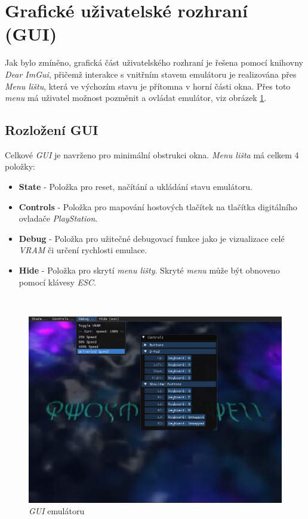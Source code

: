\section{Grafické uživatelské rozhraní (GUI)}

Jak bylo zmíněno, grafická část uživatelského rozhraní je řešena pomocí knihovny \textit{Dear ImGui}, přičemž interakce s vnitřním stavem emulátoru
je realizována přes \textit{Menu lištu}, která ve výchozím stavu je přítomna v horní části okna. Přes toto \textit{menu} má uživatel možnost
pozměnit a ovládat emulátor, viz obrázek \ref{gui-showcase}.

\subsection{Rozložení GUI}

Celkové \textit{GUI} je navrženo pro minimální obstrukci okna. \textit{Menu lišta} má celkem 4 položky:\\[\baselineskip]
\begin{minipage}{\textwidth}
\begin{itemize}
	\item{\textbf{State} - Položka pro reset, načítání a ukládání stavu emulátoru.}
	\item{\textbf{Controls} - Položka pro mapování hostových tlačítek na tlačítka digitálního ovladače \textit{PlayStation}.}
	\item{\textbf{Debug} - Položka pro užitečné debugovací funkce jako je vizualizace celé \textit{VRAM} či určení rychlosti emulace.}
	\item{\textbf{Hide} - Položka pro skrytí \textit{menu lišty}. Skryté \textit{menu} může být obnoveno pomocí klávesy \textit{ESC}.}
\end{itemize}
\end{minipage}\\[\baselineskip]

\begin{figure}[h]
	\centering
	\includegraphics[width=1.0\textwidth]{obrazky-figures/gui-showcase.png}
	\caption[Grafické uživatelské rozhraní emulátoru]{\textit{GUI} emulátoru}
	\label{gui-showcase}
\end{figure}

